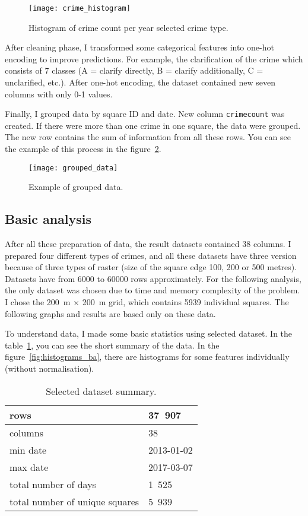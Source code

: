 \documentclass[thesis=M,english]{FITthesis}[2012/10/20]
\begin{document}
\begin{figure}\centering
    \texttt{[image: crime\_histogram]}
    \caption{Histogram of crime count per year selected crime type.}\label{fig:crime_histogram}
\end{figure}

After cleaning phase, I transformed some categorical features into one-hot encoding to improve predictions. For example, the clarification of the crime which consists of 7 classes (A = clarify directly, B = clarify additionally, C = unclarified, etc.). After one-hot encoding, the dataset contained new seven columns with only 0-1 values.

Finally, I grouped data by square ID and date. New column \texttt{crimecount} was created. If there were more than one crime in one square, the data were grouped. The new row contains the sum of information from all these rows. You can see the example of this process in the figure~\ref{fig:grouped_data}.

\begin{figure}[ht]\centering
    \texttt{[image: grouped\_data]}
    \caption{Example of grouped data.}\label{fig:grouped_data}
\end{figure}

\subsection{Basic analysis}

After all these preparation of data, the result datasets contained 38 columns. I prepared four different types of crimes, and all these datasets have three version because of three types of raster (size of the square edge 100, 200 or 500 metres). Datasets have from 6000 to 60000 rows approximately. For the following analysis, the only dataset was chosen due to time and memory complexity of the problem. I chose the 200~m $\times$ 200~m grid, which contains 5939 individual squares. The following graphs and results are based only on these data.  

To understand data, I made some basic statistics using selected dataset. In the table~\ref{tab:summary_ba}, you can see the short summary of the data. In the figure~\ref{fig:histograms_ba}, there are histograms for some features individually (without normalisation).

\begin{table}[H]\centering
    \caption{Selected dataset summary.}\label{tab:summary_ba}
    \begin{tabular}{|l|l|}\hline
        rows & 37~907 \tabularnewline \hline
        columns & 38 \tabularnewline \hline
        min date & 2013-01-02 \tabularnewline \hline
        max date & 2017-03-07 \tabularnewline \hline
        total number of days & 1~525 \tabularnewline \hline
        total number of unique squares & 5~939 \tabularnewline \hline
    \end{tabular}
\end{table}
\end{document}
